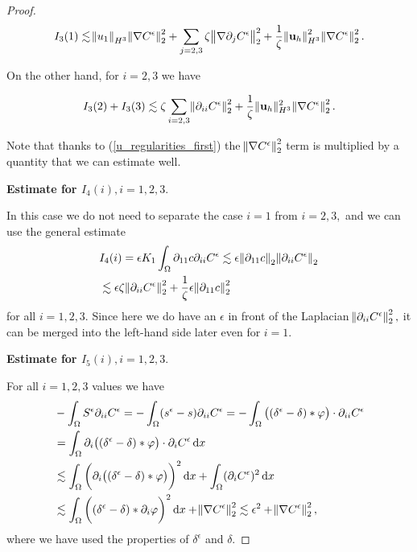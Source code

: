 \documentclass[11pt]{article}
\newcommand*\diff{\mathop{}\!\mathrm{d}}
\begin{document}
\begin{proof}
\begin{equation}
I_3(1) \lesssim \norm{u_1}_{H^3} \norm{\nabla C^\epsilon}_2^2 + \sum_{j=2,3} \zeta \norm{\nabla \partial_j C^\epsilon}_2^2 + \frac{1}{\zeta} \norm{\mathbf{u}_h}_{H^3}^2 \norm{\nabla C^\epsilon}_2^2.
\end{equation}

On the other hand, for $i = 2,3$ we have

\begin{equation}
I_3(2) + I_3(3) \lesssim \zeta \sum_{i=2,3} \norm{\partial_{ii} C^\epsilon}_2^2 + \frac{1}{\zeta} \| \mathbf{u}_h \| _ {H^3} ^ 2 \norm{\nabla C^\epsilon}_2^2.
\end{equation}

Note that thanks to (\ref{u_regularities_first}) the $\norm{\nabla C^\epsilon}_2^2$ term is multiplied by a quantity that we can estimate well.

\bigskip

\textbf{Estimate for $I_4(i), i = 1,2,3.$}

In this case we do not need to separate the case $i=1$ from $i=2,3,$ and we can use the general estimate
%
\begin{equation}
\begin{split}
& I_4(i) = \epsilon K_1 \int_\Omega \partial_{11} c \partial_{ii} C^\epsilon \lesssim \epsilon \norm{\partial_{11} c}_2 \norm{\partial_{ii} C^\epsilon}_2 \\
& \lesssim \epsilon \zeta \norm{\partial_{ii} C^\epsilon}_2^2 + \frac{1}{\zeta}\epsilon \norm{\partial_{11} c}_2^2
\end{split}
\end{equation}
%
for all $i =1,2,3.$ Since here we do have an $\epsilon$ in front of the Laplacian $ \norm{\partial_{ii} C^\epsilon}_2^2,$ it can be merged into the left-hand side later even for $i = 1.$

\bigskip

\textbf{Estimate for $I_5 (i), i = 1,2,3.$}

For all $i = 1,2,3$ values we have
%
\begin{equation}
\begin{split}
& - \int_\Omega S^\epsilon \partial_{ii} C^\epsilon = - \int_\Omega (s^\epsilon - s) \partial_{ii} C^\epsilon = - \int_\Omega \big ( (\delta^\epsilon - \delta ) \ast \varphi \big ) \cdot \partial_{ii} C^\epsilon \\
& = \int_\Omega \partial_i \big ( (\delta^\epsilon - \delta ) \ast \varphi \big ) \cdot \partial_i C^\epsilon \diff x \\
& \lesssim \int_\Omega \bigg( \partial_i \big ( (\delta^\epsilon - \delta ) \ast \varphi \big ) \bigg ) ^2 \diff x + \int_\Omega (\partial_i C^\epsilon)^2 \diff x \\
& \lesssim \int_\Omega \bigg ( (\delta^\epsilon - \delta ) \ast \partial_i \varphi \bigg ) ^2 \diff x + \norm{\nabla C^\epsilon}_2^2 \lesssim \epsilon^2 + \norm{\nabla C^\epsilon}_2^2,
\end{split}
\end{equation}
%
where we have used the properties of $\delta^\epsilon$ and $\delta.$


\end{proof}
\end{document}
